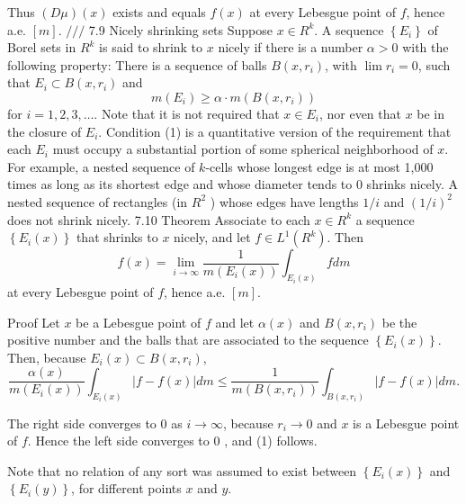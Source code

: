 Thus $(D \mu)(x)$ exists and equals $f(x)$ at every Lebesgue point of $f$, hence a.e. $[m]$.
$/ / /$
7.9 Nicely shrinking sets Suppose $x \in R^k$. A sequence $\left\{E_i\right\}$ of Borel sets in $R^k$ is said to shrink to $x$ nicely if there is a number $\alpha>0$ with the following property: There is a sequence of balls $B\left(x, r_i\right)$, with $\lim r_i=0$, such that $E_i \subset B\left(x, r_i\right)$ and
$$
m\left(E_i\right) \geq \alpha \cdot m\left(B\left(x, r_i\right)\right)
$$
for $i=1,2,3, \ldots$.
Note that it is not required that $x \in E_i$, nor even that $x$ be in the closure of $E_i$. Condition (1) is a quantitative version of the requirement that each $E_i$ must occupy a substantial portion of some spherical neighborhood of $x$. For example, a nested sequence of $k$-cells whose longest edge is at most 1,000 times as long as its shortest edge and whose diameter tends to 0 shrinks nicely. A nested sequence of rectangles (in $R^2$ ) whose edges have lengths $1 / i$ and $(1 / i)^2$ does not shrink nicely.
7.10 Theorem Associate to each $x \in R^k$ a sequence $\left\{E_i(x)\right\}$ that shrinks to $x$ nicely, and let $f \in L^1\left(R^k\right)$. Then
$$
f(x)=\lim _{i \rightarrow \infty} \frac{1}{m\left(E_i(x)\right)} \int_{E_i(x)} f d m
$$
at every Lebesgue point of $f$, hence a.e. $[m]$.

Proof Let $x$ be a Lebesgue point of $f$ and let $\alpha(x)$ and $B\left(x, r_i\right)$ be the positive number and the balls that are associated to the sequence $\left\{E_i(x)\right\}$. Then, because $E_i(x) \subset B\left(x, r_i\right)$,
$$
\frac{\alpha(x)}{m\left(E_i(x)\right)} \int_{E_i(x)}|f-f(x)| d m \leq \frac{1}{m\left(B\left(x, r_i\right)\right)} \int_{B\left(x, r_i\right)}|f-f(x)| d m .
$$

The right side converges to 0 as $i \rightarrow \infty$, because $r_i \rightarrow 0$ and $x$ is a Lebesgue point of $f$. Hence the left side converges to 0 , and (1) follows.

Note that no relation of any sort was assumed to exist between $\left\{E_i(x)\right\}$ and $\left\{E_i(y)\right\}$, for different points $x$ and $y$.

